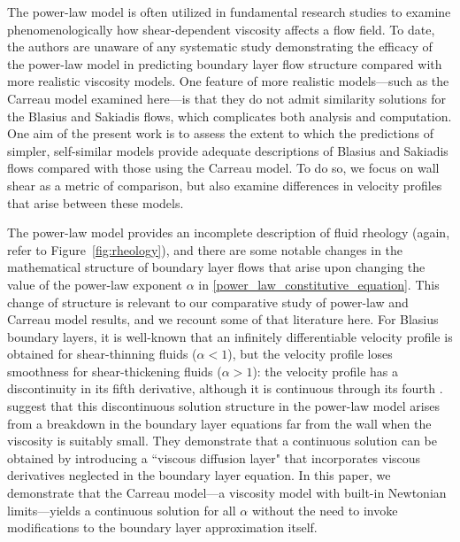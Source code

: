 \documentclass[lineno]{JFM-FLM_Au}
\begin{document}
The power-law model is often utilized in fundamental research studies to examine phenomenologically how shear-dependent viscosity affects a flow field.  To date, the authors are unaware of any systematic study demonstrating the efficacy of the power-law model in predicting boundary layer flow structure compared with more realistic viscosity models. One feature of more realistic models---such as the Carreau model examined here---is that they do not admit similarity solutions for the Blasius and Sakiadis flows, which complicates both analysis and computation.  One aim of the present work is to assess the extent to which the predictions of simpler, self-similar models provide adequate descriptions of Blasius and Sakiadis flows compared with those using the Carreau model.  To do so, we focus on wall shear as a metric of comparison, but also examine differences in velocity profiles that arise between these models.

The power-law model provides an incomplete description of fluid rheology (again, refer to Figure~\ref{fig:rheology}), and there are some notable changes in the mathematical structure of boundary layer flows that arise upon changing the value of the power-law exponent $\alpha$ in \eqref{power_law_constitutive_equation}.  This change of structure is relevant to our comparative study of power-law and Carreau model results, and we recount some of that literature here.  For Blasius boundary layers, it is well-known that an infinitely differentiable velocity profile is obtained for shear-thinning fluids ($\alpha < 1$), but the velocity profile loses smoothness for shear-thickening fluids ($\alpha>1$): the velocity profile has a discontinuity in its fifth derivative, although it is continuous through its fourth \citep{Zhizhin1978-us, Pavlov1982-qh}. \citet{Dabrowski} suggest that this discontinuous solution structure in the power-law model arises from a breakdown in the boundary layer equations far from the wall when the viscosity is suitably small.  They demonstrate that a continuous solution can be obtained by introducing a ``viscous diffusion layer" that incorporates viscous derivatives neglected in the boundary layer equation. In this paper, we demonstrate that the Carreau model---a viscosity model with built-in Newtonian limits---yields a continuous solution for all $\alpha$ without the need to invoke modifications to the boundary layer approximation itself.
\end{document}
